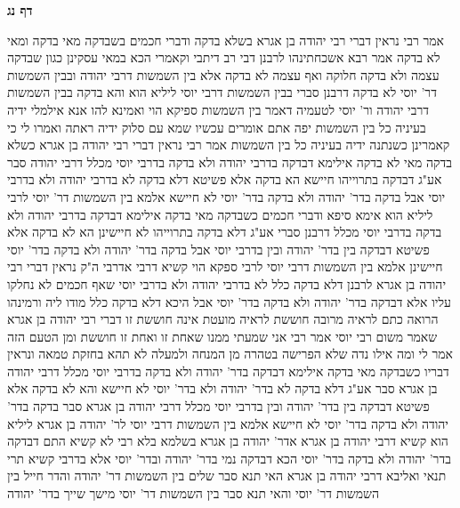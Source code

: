 \documentclass[12pt, openany]{book}
\newcommand{\sethebfont}{
\fontsize{10.5pt}{21.0pt} \selectfont
}
\newcommand{\twocol}[1]{
	{\sethebfont \begin{multicols}{2}
			#1
	\end{multicols}}	
}
\newcommand{\sectname}{}
\newcommand{\newsection}[1]{
	\addcontentsline{toc}{section}{#1}
	\renewcommand{\sectname}{#1}	
	\vspace{-\baselineskip}
	\begin{center}
		\textbf{%
\fontsize{16pt}{16pt}\selectfont
			#1}
	\end{center}
	\vspace{-\baselineskip}
	\nopagebreak
}
\begin{document}
\newsection{דף נג}
\twocol{אמר רבי נראין דברי רבי יהודה בן אגרא בשלא בדקה ודברי חכמים בשבדקה 
מאי בדקה ומאי לא בדקה אמר רבא אשכחתינהו לרבנן דבי רב דיתבי וקאמרי הכא במאי עסקינן כגון שבדקה עצמה ולא בדקה חלוקה ואף עצמה לא בדקה אלא בין השמשות דרבי יהודה ובבין השמשות דר' יוסי לא בדקה 
דרבנן סברי בבין השמשות דרבי יוסי ליליא הוא והא בדקה בבין השמשות דרבי יהודה ור' יוסי לטעמיה דאמר בין השמשות ספיקא הוי 
ואמינא להו אנא אילמלי ידיה בעיניה כל בין השמשות יפה אתם אומרים עכשיו שמא עם סלוק ידיה ראתה ואמרו לי כי קאמרינן כשנתנה ידיה בעיניה כל בין השמשות 
אמר רבי נראין דברי רבי יהודה בן אגרא כשלא בדקה מאי לא בדקה 
אילימא דבדקה בדרבי יהודה ולא בדקה בדרבי יוסי מכלל דרבי יהודה סבר אע"ג דבדקה בתרוייהו חיישא הא בדקה 
אלא פשיטא דלא בדקה לא בדרבי יהודה ולא בדרבי יוסי אבל בדקה בדר' יהודה ולא בדקה בדר' יוסי לא חיישא 
אלמא בין השמשות דר' יוסי לרבי ליליא הוא אימא סיפא ודברי חכמים כשבדקה מאי בדקה 
אילימא דבדקה בדרבי יהודה ולא בדקה בדרבי יוסי מכלל דרבנן סברי אע"ג דלא בדקה בתרוייהו לא חיישינן הא לא בדקה 
אלא פשיטא דבדקה בין בדר' יהודה ובין בדרבי יוסי אבל בדקה בדר' יהודה ולא בדקה בדר' יוסי חיישינן 
אלמא בין השמשות דרבי יוסי לרבי ספקא הוי קשיא דרבי אדרבי 
ה"ק נראין דברי רבי יהודה בן אגרא לרבנן דלא בדקה כלל לא בדרבי יהודה ולא בדרבי יוסי שאף חכמים לא נחלקו עליו אלא דבדקה בדר' יהודה ולא בדקה בדר' יוסי אבל היכא דלא בדקה כלל מודו ליה 
ורמינהו הרואה כתם לראיה מרובה חוששת לראיה מועטת אינה חוששת זו דברי רבי יהודה בן אגרא שאמר משום רבי יוסי 
אמר רבי אני שמעתי ממנו שאחת זו ואחת זו חוששת ומן הטעם הזה אמר לי ומה אילו נדה שלא הפרישה בטהרה מן המנחה ולמעלה לא תהא בחזקת טמאה ונראין דבריו כשבדקה 
מאי בדקה אילימא דבדקה בדר' יהודה ולא בדקה בדרבי יוסי מכלל דרבי יהודה בן אגרא סבר אע"ג דלא בדקה לא בדר' יהודה ולא בדר' יוסי לא חיישא והא לא בדקה 
אלא פשיטא דבדקה בין בדר' יהודה ובין בדרבי יוסי מכלל דרבי יהודה בן אגרא סבר בדקה בדר' יהודה ולא בדקה בדר' יוסי לא חיישא
אלמא בין השמשות דרבי יוסי לר' יהודה בן אגרא ליליא הוא קשיא דרבי יהודה בן אגרא אדר' יהודה בן אגרא 
בשלמא בלא רבי לא קשיא התם דבדקה בדר' יהודה ולא בדקה בדר' יוסי הכא דבדקה נמי בדר' יהודה ובדר' יוסי אלא בדרבי קשיא 
תרי תנאי ואליבא דרבי יהודה בן אגרא האי תנא סבר שלים בין השמשות דר' יהודה
והדר חייל בין השמשות דר' יוסי והאי תנא סבר בין השמשות דר' יוסי מישך שייך בדר' יהודה 
}
\end{document}

